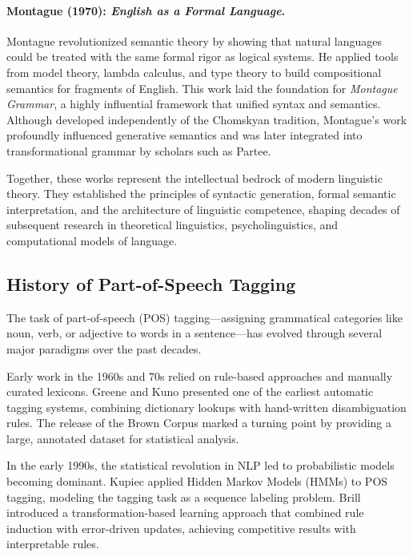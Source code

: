 \paragraph{Montague (1970): \textit{English as a Formal Language}.}
Montague revolutionized semantic theory by showing that natural languages could be treated with the same formal rigor as logical systems. He applied tools from model theory, lambda calculus, and type theory to build compositional semantics for fragments of English. This work laid the foundation for \emph{Montague Grammar}, a highly influential framework that unified syntax and semantics. Although developed independently of the Chomskyan tradition, Montague’s work profoundly influenced generative semantics and was later integrated into transformational grammar by scholars such as Partee.

Together, these works represent the intellectual bedrock of modern linguistic theory. They established the principles of syntactic generation, formal semantic interpretation, and the architecture of linguistic competence, shaping decades of subsequent research in theoretical linguistics, psycholinguistics, and computational models of language.


\subsection{History of Part-of-Speech Tagging}

The task of part-of-speech (POS) tagging—assigning grammatical categories like noun, verb, or adjective to words in a sentence—has evolved through several major paradigms over the past decades.

Early work in the 1960s and 70s relied on rule-based approaches and manually curated lexicons. Greene and Kuno \cite{greene1963automatic} presented one of the earliest automatic tagging systems, combining dictionary lookups with hand-written disambiguation rules. The release of the Brown Corpus \cite{francis1979brown} marked a turning point by providing a large, annotated dataset for statistical analysis.

In the early 1990s, the statistical revolution in NLP led to probabilistic models becoming dominant. Kupiec \cite{kupiec1992robust} applied Hidden Markov Models (HMMs) to POS tagging, modeling the tagging task as a sequence labeling problem. Brill \cite{brill1995transformation} introduced a transformation-based learning approach that combined rule induction with error-driven updates, achieving competitive results with interpretable rules.

